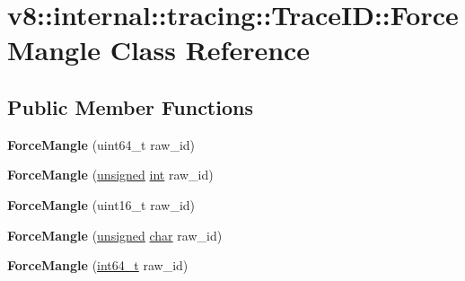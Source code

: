 \hypertarget{classv8_1_1internal_1_1tracing_1_1TraceID_1_1ForceMangle}{}\section{v8\+:\+:internal\+:\+:tracing\+:\+:Trace\+ID\+:\+:Force\+Mangle Class Reference}
\label{classv8_1_1internal_1_1tracing_1_1TraceID_1_1ForceMangle}
\subsection*{Public Member Functions}
\begin{DoxyCompactItemize}
\item 
\mbox{\label{classv8_1_1internal_1_1tracing_1_1TraceID_1_1ForceMangle_af6e5547598746b00122c7c083391937f}} 
{\bfseries Force\+Mangle} (uint64\+\_\+t raw\+\_\+id)
\item 
\mbox{\label{classv8_1_1internal_1_1tracing_1_1TraceID_1_1ForceMangle_aeba32d43e1ae6179c38c620e583e6e74}} 
{\bfseries Force\+Mangle} (\mbox{\hyperlink{classunsigned}{unsigned}} \mbox{\hyperlink{classint}{int}} raw\+\_\+id)
\item 
\mbox{\label{classv8_1_1internal_1_1tracing_1_1TraceID_1_1ForceMangle_ad4588a7b71f5b28b1fb87c858240ed2d}} 
{\bfseries Force\+Mangle} (uint16\+\_\+t raw\+\_\+id)
\item 
\mbox{\label{classv8_1_1internal_1_1tracing_1_1TraceID_1_1ForceMangle_a658789075cca6855826823b984c496ff}} 
{\bfseries Force\+Mangle} (\mbox{\hyperlink{classunsigned}{unsigned}} \mbox{\hyperlink{classchar}{char}} raw\+\_\+id)
\item 
\mbox{\label{classv8_1_1internal_1_1tracing_1_1TraceID_1_1ForceMangle_ac554899f21bf88d1ca3cbd3f71b565af}} 
{\bfseries Force\+Mangle} (\mbox{\hyperlink{classint64__t}{int64\+\_\+t}} raw\+\_\+id)
\item 
\mbox{\label{classv8_1_1internal_1_1tracing_1_1TraceID_1_1ForceMangle_a821dc69283a818ef702ff137a8b53c9b}} 

\end{DoxyCompactItemize}
